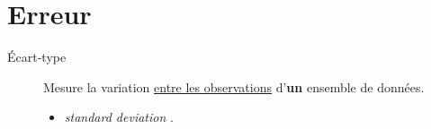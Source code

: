 \documentclass[10pt, french]{article}
\begin{document}
\begin{multicols*}{2}
\begin{center}
\begin{tikzpicture}[x=0.75pt,y=0.75pt,yscale=-1,xscale=1]
\end{tikzpicture}
\end{center}


\section{Erreur}

\begin{description}
	\item[Écart-type]	Mesure la variation \underline{entre les observations} d'\textbf{un} ensemble de données.
		\begin{itemize}[leftmargin = *]
		\item	\og \textit{standard deviation} \fg{}.
		\end{itemize}
		\begin{center}


\begin{tikzpicture}[x=0.75pt,y=0.75pt,yscale=-1,xscale=1]


\end{tikzpicture}
\end{center}
\end{description}
\end{multicols*}
\end{document}
